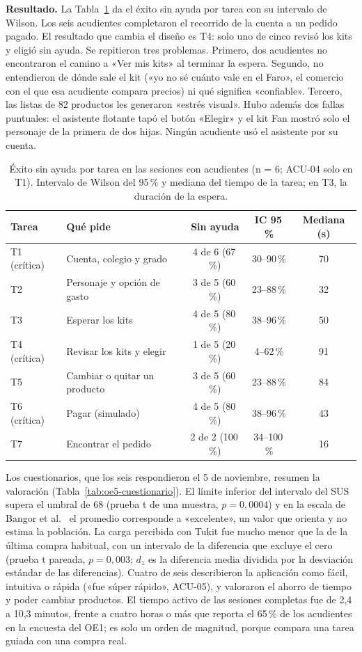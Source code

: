 \textbf{Resultado.} La Tabla~\ref{tab:oe5-tareas} da el éxito sin ayuda por tarea con su intervalo de
Wilson. Los seis acudientes completaron el recorrido
de la cuenta a un pedido pagado. El resultado que cambia el diseño es T4: solo
uno de cinco revisó los kits y eligió sin ayuda. Se repitieron tres problemas. Primero, dos acudientes no
encontraron el camino a «Ver mis kits» al terminar la espera. Segundo, no entendieron de dónde sale el kit
(«yo no sé cuánto vale en el Faro», el comercio con el que esa acudiente compara precios) ni qué significa «confiable». Tercero, las listas de 82 productos les
generaron «estrés visual». Hubo además dos fallas puntuales: el asistente flotante tapó el botón «Elegir» y el kit Fan mostró solo el personaje de la primera de dos hijas. Ningún acudiente
usó el asistente por su cuenta.

\begin{table}[htbp]
\centering
\small
\caption{Éxito sin ayuda por tarea en las sesiones con acudientes (n = 6; ACU-04 solo en T1).
Intervalo de Wilson del 95\,\% y mediana del tiempo de la tarea; en T3, la duración de la espera.}
\label{tab:oe5-tareas}
\begin{tabular}{@{}llccc@{}}
\toprule
Tarea & Qué pide & Sin ayuda & IC 95\,\% & Mediana (s) \\
\midrule
T1 (crítica) & Cuenta, colegio y grado & 4 de 6 (67\,\%) & 30--90\,\% & 70 \\
T2 & Personaje y opción de gasto & 3 de 5 (60\,\%) & 23--88\,\% & 32 \\
T3 & Esperar los kits & 4 de 5 (80\,\%) & 38--96\,\% & 50 \\
T4 (crítica) & Revisar los kits y elegir & 1 de 5 (20\,\%) & 4--62\,\% & 91 \\
T5 & Cambiar o quitar un producto & 3 de 5 (60\,\%) & 23--88\,\% & 84 \\
T6 (crítica) & Pagar (simulado) & 4 de 5 (80\,\%) & 38--96\,\% & 43 \\
T7 & Encontrar el pedido & 2 de 2 (100\,\%) & 34--100\,\% & 16 \\
\bottomrule
\end{tabular}
\end{table}

Los cuestionarios, que los seis respondieron el 5 de noviembre, resumen la valoración
(Tabla~\ref{tab:oe5-cuestionario}). El límite inferior del intervalo del SUS supera el umbral de 68 (prueba t
de una muestra, $p = 0{,}0004$) y en la escala de Bangor et al.~\citep{bangor_determining_2009} el promedio
corresponde a «excelente», un valor que orienta y no estima la población. La carga percibida con Tukit fue
mucho menor que la de la última compra habitual, con un intervalo de la diferencia que excluye el cero (prueba
t pareada, $p = 0{,}003$; $d_z$ es la diferencia media dividida por la desviación estándar de las
diferencias). Cuatro de seis describieron la aplicación como fácil, intuitiva o rápida («fue súper rápido»,
ACU-05), y valoraron el ahorro de tiempo y poder cambiar productos. El tiempo activo de las sesiones completas fue de 2,4 a 10,3 minutos, frente a cuatro horas o más
que reporta el 65\,\% de los acudientes en la encuesta del OE1; es solo un orden de magnitud, porque compara
una tarea guiada con una compra real.

